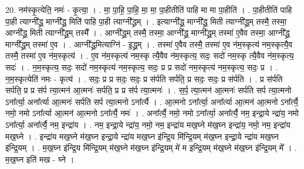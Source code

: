 \documentclass[17pt]{extarticle}
\begin{document}
20. नम॑स्कृ॒त्येति॒ नमः॑ - कृ॒त्या॒ । . मा॒ पा॒हि॒ पा॒हि॒ मा॒ मा॒ पा॒हीतीति॑ पाहि मा मा पा॒हीति॑ । . पा॒हीतीति॑ पाहि पा॒ही त्याग्नी᳚द्ध्र॒ माग्नी᳚द्ध्र॒ मिति॑ पाहि पा॒ही त्याग्नी᳚द्ध्रम् । . इत्याग्नी᳚द्ध्र॒ माग्नी᳚द्ध्र॒ मिती त्याग्नी᳚द्ध्र॒म् तस्मै॒ तस्मा॒ आग्नी᳚द्ध्र॒ मिती त्याग्नी᳚द्ध्र॒म् तस्मै᳚ । . आग्नी᳚द्ध्र॒म् तस्मै॒ तस्मा॒ आग्नी᳚द्ध्र॒ माग्नी᳚द्ध्र॒म् तस्मा॑ ए॒वैव तस्मा॒ आग्नी᳚द्ध्र॒ माग्नी᳚द्ध्र॒म् तस्मा॑ ए॒व । . आग्नी᳚द्ध्र॒मित्याग्नि॑ - इ॒द्ध्र॒म् । . तस्मा॑ ए॒वैव तस्मै॒ तस्मा॑ ए॒व न॑म॒स्कृत्य॑ नम॒स्कृत्यै॒व तस्मै॒ तस्मा॑ ए॒व न॑म॒स्कृत्य॑ । . ए॒व न॑म॒स्कृत्य॑ नम॒स्कृ त्यै॒वैव न॑म॒स्कृत्य॒ सदः॒ सदो॑ नम॒स्कृ त्यै॒वैव न॑म॒स्कृत्य॒ सदः॑ । . न॒म॒स्कृत्य॒ सदः॒ सदो॑ नम॒स्कृत्य॑ नम॒स्कृत्य॒ सदः॒ प्र प्र सदो॑ नम॒स्कृत्य॑ नम॒स्कृत्य॒ सदः॒ प्र । . न॒म॒स्कृत्येति॑ नमः - कृत्य॑ । . सदः॒ प्र प्र सदः॒ सदः॒ प्र स॑र्पति सर्पति॒ प्र सदः॒ सदः॒ प्र स॑र्पति । . प्र स॑र्पति सर्पति॒ प्र प्र स॑र्प त्या॒त्मन॑ आ॒त्मनः॑ सर्पति॒ प्र प्र स॑र्प त्या॒त्मनः॑ । . स॒र्प॒ त्या॒त्मन॑ आ॒त्मनः॑ सर्पति सर्प त्या॒त्मनो ऽना᳚र्त्या॒ अना᳚र्त्या आ॒त्मनः॑ सर्पति सर्प त्या॒त्मनो ऽना᳚र्त्यै । . आ॒त्मनो ऽना᳚र्त्या॒ अना᳚र्त्या आ॒त्मन॑ आ॒त्मनो ऽना᳚र्त्यै॒ नमो॒ नमो ऽना᳚र्त्या आ॒त्मन॑ आ॒त्मनो ऽना᳚र्त्यै॒ नमः॑ । . अना᳚र्त्यै॒ नमो॒ नमो ऽना᳚र्त्या॒ अना᳚र्त्यै॒ नम॒ इन्द्रा॒ये न्द्रा॑य॒ नमो ऽना᳚र्त्या॒ अना᳚र्त्यै॒ नम॒ इन्द्रा॑य । . नम॒ इन्द्रा॒ये न्द्रा॑य॒ नमो॒ नम॒ इन्द्रा॑य मख॒घ्ने म॑ख॒घ्न इन्द्रा॑य॒ नमो॒ नम॒ इन्द्रा॑य मख॒घ्ने । . इन्द्रा॑य मख॒घ्ने म॑ख॒घ्न इन्द्रा॒ये न्द्रा॑य मख॒घ्न इ॑न्द्रि॒य मि॑न्द्रि॒यम् म॑ख॒घ्न इन्द्रा॒ये न्द्रा॑य मख॒घ्न इ॑न्द्रि॒यम् । . म॒ख॒घ्न इ॑न्द्रि॒य मि॑न्द्रि॒यम् म॑ख॒घ्ने म॑ख॒घ्न इ॑न्द्रि॒यम् मे॑ म इन्द्रि॒यम् म॑ख॒घ्ने म॑ख॒घ्न इ॑न्द्रि॒यम् मे᳚ । . म॒ख॒घ्न इति॑ मख - घ्ने । \newline
\end{document}
